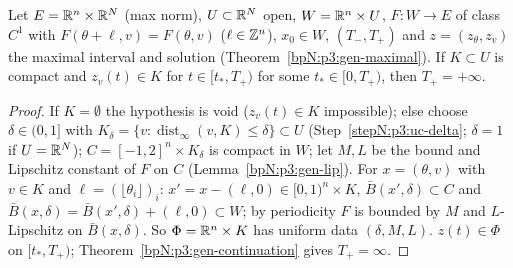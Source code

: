 \begin{lemma}\label{bpN:p11:continuation}
Let $E=\mathbb{R}^n\times\mathbb{R}^N$ (max norm), $U\subset\mathbb{R}^N$ open, $W=\mathbb{R}^n\times U$, $F:W\to E$ of class $C^1$ with $F(\theta+\ell,v)=F(\theta,v)$ ($\ell\in\mathbb{Z}^n$), $x_0\in W$, $(T_-,T_+)$ and $z=(z_\theta,z_v)$ the maximal interval and solution (Theorem~\ref{bpN:p3:gen-maximal}). If $K\subset U$ is compact and $z_v(t)\in K$ for $t\in[t_*,T_+)$ for some $t_*\in[0,T_+)$, then $T_+=+\infty$.
\end{lemma}
\begin{proof}
\label{stepN:p11:ct-data} If $K=\emptyset$ the hypothesis is void ($z_v(t)\in K$ impossible); else choose $\delta\in(0,1]$ with $K_\delta=\{v:\operatorname{dist}_\infty(v,K)\le\delta\}\subset U$ (Step~\ref{stepN:p3:uc-delta}; $\delta=1$ if $U=\mathbb{R}^N$); $C=[-1,2]^n\times K_\delta$ is compact in $W$; let $M,L$ be the bound and Lipschitz constant of $F$ on $C$ (Lemma~\ref{bpN:p3:gen-lip}). For $x=(\theta,v)$ with $v\in K$ and $\ell=(\lfloor\theta_i\rfloor)_i$: $x'=x-(\ell,0)\in[0,1)^n\times K$, $\bar B(x',\delta)\subset C$ and $\bar B(x,\delta)=\bar B(x',\delta)+(\ell,0)\subset W$; by periodicity $F$ is bounded by $M$ and $L$-Lipschitz on $\bar B(x,\delta)$. So $\Phi=\mathbb{R}^n\times K$ has uniform data $(\delta,M,L)$.
\label{stepN:p11:ct-concl} $z(t)\in\Phi$ on $[t_*,T_+)$; Theorem~\ref{bpN:p3:gen-continuation} gives $T_+=\infty$.
\end{proof}

